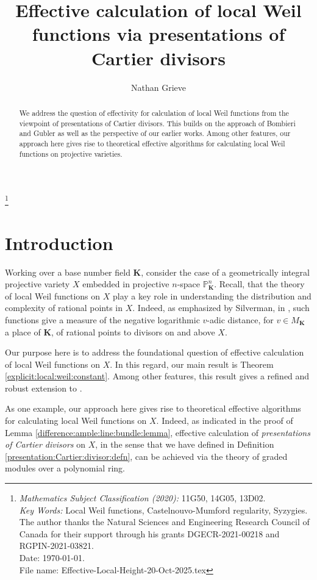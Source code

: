 \documentclass[10pt]{amsart}
\title[Effective calculation of local Weil functions]{Effective calculation of local Weil functions via presentations of Cartier divisors}
\author{Nathan Grieve}
\newcommand{\filename}{Effective-Local-Height-20-Oct-2025.tex}
\newcommand{\KK}{\mathbf{K}}
\newcommand{\PP}{\mathbb{P}} %
\theoremstyle{definition}
\numberwithin{equation}{section}
\begin{document}
\begin{abstract}
We address the question of effectivity for calculation of local Weil functions from the viewpoint of presentations of Cartier divisors.  This builds on the approach of Bombieri and Gubler as well as the perspective of our earlier works.  Among other features, our approach here gives rise to theoretical effective algorithms for calculating local Weil functions on projective varieties.
\end{abstract}


\thanks{
\emph{Mathematics Subject Classification (2020):}  11G50, 14G05, 13D02. \\
\emph{Key Words:} Local Weil functions, Castelnouvo-Mumford regularity, Syzygies.  \\
The author thanks the Natural Sciences and Engineering Research Council of Canada for their support through his grants DGECR-2021-00218 and RGPIN-2021-03821. \\
Date: \today.  \\
File name: \filename}

\maketitle

\section{Introduction}\label{intro}

Working over a base number field $\KK$, consider the case of a geometrically integral projective variety $X$ embedded in projective $n$-space $\PP^n_{\KK}$.  Recall, that the theory of local Weil functions on $X$ play a key role in understanding the distribution and complexity of rational points in $X$.  Indeed, as emphasized by Silverman, in \cite{Silverman:1987}, such functions give a measure of  the negative logarithmic $v$-adic distance, for $v \in M_{\KK}$ a place of $\KK$, of rational points to divisors on and above $X$.  

Our purpose here is to address the foundational question of effective calculation of local Weil functions on $X$.  In this regard, our main result is Theorem \ref{explicit:local:weil:constant}.   Among other features, this result gives a refined and robust extension to \cite[Section 2.2]{Bombieri:Gubler}.   

As one example, our approach here gives rise to theoretical effective algorithms for calculating local Weil functions on $X$.   Indeed, as indicated in the proof of Lemma \ref{difference:ample:line:bundle:lemma}, effective calculation of \emph{presentations of Cartier divisors} on $X$, in the sense that we have defined in Definition \ref{presentation:Cartier:divisor:defn}, can be achieved via the theory of graded modules over a polynomial ring.  
\end{document}
